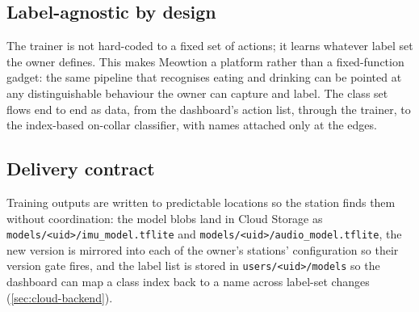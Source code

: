 \subsection{Label-agnostic by design}

The trainer is not hard-coded to a fixed set of actions; it learns whatever label set the owner
defines. This makes Meowtion a platform rather than a fixed-function gadget: the same pipeline that
recognises eating and drinking can be pointed at any distinguishable behaviour the owner can capture
and label. The class set flows end to end as data, from the dashboard's action list, through the
trainer, to the index-based on-collar classifier, with names attached only at the edges.

\subsection{Delivery contract}

Training outputs are written to predictable locations so the station finds them without coordination:
the model blobs land in Cloud Storage as \texttt{models/<uid>/\allowbreak imu\_model.tflite} and
\texttt{models/<uid>/\allowbreak audio\_model.tflite}, the new version is mirrored into each of the owner's
stations' configuration so their version gate fires, and the label list is stored in
\texttt{users/<uid>/models} so the dashboard can map a class index back to a name across label-set
changes (\cref{sec:cloud-backend}).
